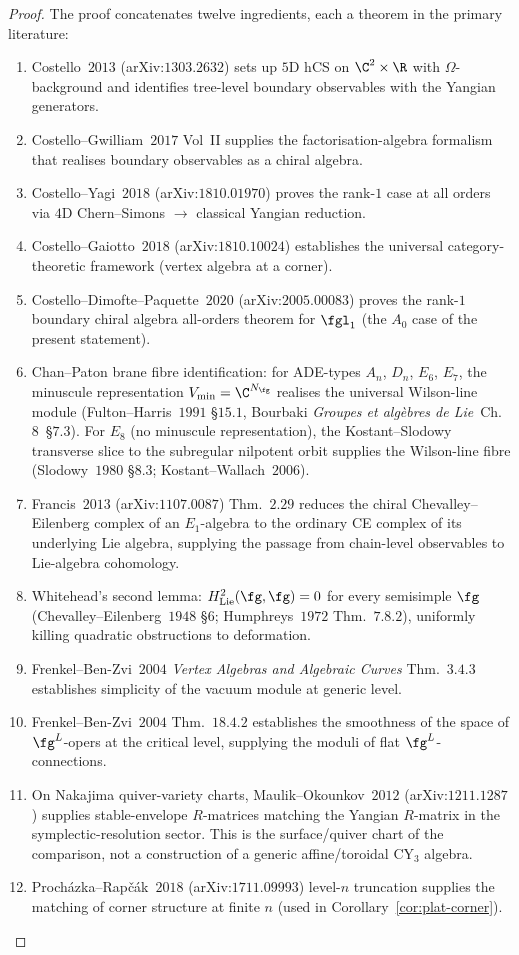 \begin{proof}
The proof concatenates twelve ingredients, each a theorem in the
primary literature:
\begin{enumerate}[label=\textup{(P\arabic*)}]
\item Costello~$2013$ (arXiv:$1303.2632$) sets up $5$D hCS on
$\C^2 \times \R$ with $\Omega$-background and identifies tree-level
boundary observables with the Yangian generators.
\item Costello--Gwilliam~$2017$ Vol~II supplies the factorisation-algebra
formalism that realises boundary observables as a chiral algebra.
\item Costello--Yagi~$2018$ (arXiv:$1810.01970$) proves the rank-$1$
case at all orders via $4$D Chern--Simons $\to$ classical Yangian
reduction.
\item Costello--Gaiotto~$2018$ (arXiv:$1810.10024$) establishes the
universal category-theoretic framework (vertex algebra at a corner).
\item Costello--Dimofte--Paquette~$2020$ (arXiv:$2005.00083$) proves the
rank-$1$ boundary chiral algebra all-orders theorem for $\fgl_1$ (the
$A_0$ case of the present statement).
\item Chan--Paton brane fibre identification: for ADE-types $A_n$,
$D_n$, $E_6$, $E_7$, the minuscule representation
$V_{\mathrm{min}} = \C^{N_\fg}$ realises the universal
Wilson-line module (Fulton--Harris~$1991$ \S$15.1$, Bourbaki
\emph{Groupes et alg\`ebres de Lie}~Ch.~$8$~\S$7.3$).
For $E_8$ (no minuscule representation), the Kostant--Slodowy
transverse slice to the subregular nilpotent orbit supplies the
Wilson-line fibre (Slodowy~$1980$ \S$8.3$; Kostant--Wallach~$2006$).
\item Francis~$2013$ (arXiv:$1107.0087$) Thm.~$2.29$ reduces the
chiral Chevalley--Eilenberg complex of an $E_1$-algebra to the
ordinary CE complex of its underlying Lie algebra, supplying the
passage from chain-level observables to Lie-algebra cohomology.
\item Whitehead's second lemma: $H^2_{\mathrm{Lie}}(\fg, \fg) = 0$ for
every semisimple $\fg$ (Chevalley--Eilenberg~$1948$ \S$6$;
Humphreys~$1972$ Thm.~$7.8.2$), uniformly killing quadratic
obstructions to deformation.
\item Frenkel--Ben-Zvi~$2004$ \emph{Vertex Algebras and Algebraic
Curves} Thm.~$3.4.3$ establishes simplicity of the vacuum module at
generic level.
\item Frenkel--Ben-Zvi~$2004$ Thm.~$18.4.2$ establishes the smoothness
of the space of $\fg^L$-opers at the critical level, supplying the
moduli of flat $\fg^L$-connections.
\item On Nakajima quiver-variety charts, Maulik--Okounkov~$2012$
(arXiv:$1211.1287$) supplies stable-envelope \(R\)-matrices matching
the Yangian \(R\)-matrix in the symplectic-resolution sector.  This is
the surface/quiver chart of the comparison, not a construction of a
generic affine/toroidal CY$_3$ algebra.
\item Proch\'azka--Rap\v{c}\'ak~$2018$ (arXiv:$1711.09993$) level-$n$
truncation supplies the matching of corner structure at finite $n$
(used in Corollary~\ref{cor:plat-corner}).
\end{enumerate}


\end{proof}
